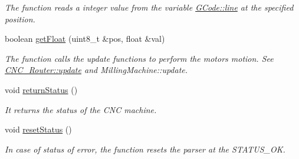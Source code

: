 \begin{DoxyCompactItemize}
\begin{DoxyCompactList}\small\item\em The function reads a integer value from the variable \hyperlink{class_g_code_a20d7c90740e9e139b24f68336ad8c8f1}{G\+Code\+::line} at the specified position. \end{DoxyCompactList}\item 
boolean \hyperlink{class_g_code_abd9c3a13cf8f2958d8d9f0a563855e7b}{get\+Float} (uint8\+\_\+t \&pos, float \&val)
\begin{DoxyCompactList}\small\item\em The function calls the update functions to perform the motors motion. See \hyperlink{class_c_n_c___router_ad67d003f8bb12c60f9752126d47408f6}{C\+N\+C\+\_\+\+Router\+::update} and Milling\+Machine\+::update. \end{DoxyCompactList}\item 
void \hyperlink{class_g_code_a9f7a4d057f394dcc4163f00a2dc6770e}{return\+Status} ()
\begin{DoxyCompactList}\small\item\em It returns the status of the C\+N\+C machine. \end{DoxyCompactList}\item 
void \hyperlink{class_g_code_ab8dbd55ab693f488c083d4fc97a00044}{reset\+Status} ()
\begin{DoxyCompactList}\small\item\em In case of status of error, the function resets the parser at the S\+T\+A\+T\+U\+S\+\_\+\+O\+K. \end{DoxyCompactList}\end{DoxyCompactItemize}
